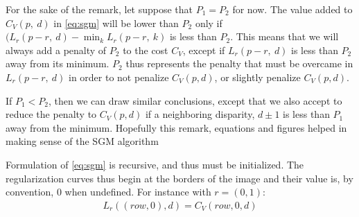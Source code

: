 \begin{remark}
    For the sake of the remark, let suppose that $P_1=P_2$ for now. The value added to $C_V(p, ~d)$ in \eqref{eq:sgm} will be lower than $P_2$ only if $(L_r(p-r,~d) - \min_k L_r(p-r,~k)$ is less than $P_2$. This means that we will always add a penalty of $P_2$ to the cost $C_V$, except if $L_r(p-r,~d)$ is less than $P_2$ away from its minimum. $P_2$ thus represents the penalty that must be overcame in $L_r(p-r,~d)$ in order to not penalize $C_V(p,d)$, or slightly penalize $C_V(p,d)$.
    
    If $P_1<P_2$, then we can draw similar conclusions, except that we also accept to reduce the penalty to $C_V(p,d)$ if a neighboring disparity, \ie $d\pm1$ is less than $P_1$ away from the minimum. Hopefully this remark, equations and figures helped in making sense of the SGM algorithm
\end{remark}

Formulation of \cref{eq:sgm} is recursive, and thus must be initialized. The regularization curves thus begin at the borders of the image and their value is, by convention, $0$ when undefined. For instance with $r=(0,1)$:
\begin{align*}
    L_r((row, 0),d) = C_V(row, 0 ,d)
\end{align*} 

